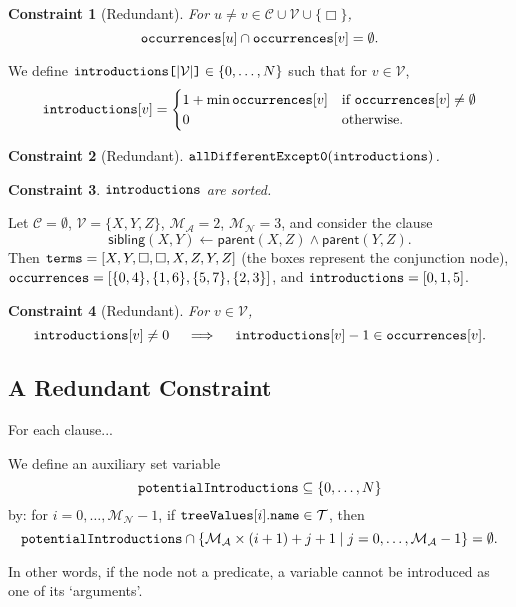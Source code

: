 \documentclass[runningheads]{llncs}
\newtheorem{constraint}{Constraint}
\newcommand{\variable}[1]{\texttt{\textup{#1}}}
\newcommand{\arrayd}[3]{\variable{{#1}[}{#2}\variable{]} \in {#3}}
\newcommand{\variables}{\mathcal{V}}
\newcommand{\constants}{\mathcal{C}}
\newcommand{\tokens}{\mathcal{T}}
\newcommand{\maxArity}{\mathcal{M}_{\mathcal{A}}}
\newcommand{\maxNumNodes}{\mathcal{M}_{\mathcal{N}}}
\begin{document}
\begin{constraint}[Redundant]
  For $u \ne v \in \constants{} \cup \variables{} \cup \{ \Box \}$,
  \[
    \variable{occurrences}[u] \cap \variable{occurrences}[v] = \emptyset.
  \]
\end{constraint}

\begin{definition}
  We define $\arrayd{introductions}{|\variables{}|}{\{ 0, \dots, N \}}$ such
  that for $v \in \variables{}$,
  \[
    \variable{introductions}[v] = \begin{cases}
      1 + \min \variable{occurrences}[v] & \text{if }
      \variable{occurrences}[v] \ne \emptyset\\
      0 & \text{otherwise.}
    \end{cases}
  \]
\end{definition}

\begin{constraint}[Redundant]
  $\variable{allDifferentExcept0}(\variable{introductions})$.
\end{constraint}

\begin{constraint}
  $\variable{introductions}$ are sorted.
\end{constraint}

\begin{example}
  Let $\constants{} = \emptyset$, $\variables{} = \{ X, Y, Z \}$, $\maxArity{} =
  2$, $\maxNumNodes{} = 3$, and consider the clause
  \[
    \mathsf{sibling}(X, Y) \gets \mathsf{parent}(X, Z) \land
    \mathsf{parent}(Y, Z).
  \]
  Then $\variable{terms} = [X, Y, \Box, \Box, X, Z, Y, Z]$ (the boxes represent
  the conjunction node), $\variable{occurrences} = [\{ 0, 4 \}, \{ 1, 6 \},
  \{ 5, 7 \}, \{ 2, 3 \}]$, and $\variable{introductions} = [0, 1, 5]$.
\end{example}

\begin{constraint}[Redundant]
  For $v \in \variables{}$,
  \[
    \variable{introductions}[v] \ne 0 \quad \implies \quad
    \variable{introductions}[v] - 1 \in \variable{occurrences}[v].
  \]
\end{constraint}

\subsection{A Redundant Constraint}

For each clause...

\begin{definition}
  We define an auxiliary set variable
  \[
    \variable{potentialIntroductions} \subseteq \{ 0, \dots, N \}
  \]
  by: for $i = 0, \dots, \maxNumNodes{} - 1$, if
  $\variable{treeValues}[i].\variable{name} \in \tokens{}$, then
  \[
    \variable{potentialIntroductions} \cap \{ \maxArity{} \times (i + 1) + j + 1
    \mid j = 0, \dots, \maxArity{} - 1 \} = \emptyset.
  \]
\end{definition} %
In other words, if the node not a predicate, a variable cannot be introduced as
one of its `arguments'.
\end{document}
